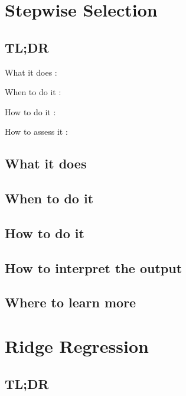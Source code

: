 \documentclass[
]{book}
\begin{document}
\hypertarget{stepwise-selection}{%
\chapter{Stepwise Selection}\label{stepwise-selection}}

\hypertarget{tldr-12}{%
\section{TL;DR}\label{tldr-12}}

What it does
:

When to do it
:

How to do it
:

How to assess it
:

\hypertarget{what-it-does-12}{%
\section{What it does}\label{what-it-does-12}}

\hypertarget{when-to-do-it-12}{%
\section{When to do it}\label{when-to-do-it-12}}

\hypertarget{how-to-do-it-12}{%
\section{How to do it}\label{how-to-do-it-12}}

\hypertarget{how-to-interpret-the-output-12}{%
\section{How to interpret the output}\label{how-to-interpret-the-output-12}}

\hypertarget{where-to-learn-more-12}{%
\section{Where to learn more}\label{where-to-learn-more-12}}

\hypertarget{ridge-regression}{%
\chapter{Ridge Regression}\label{ridge-regression}}

\hypertarget{tldr-13}{%
\section{TL;DR}\label{tldr-13}}
\end{document}

